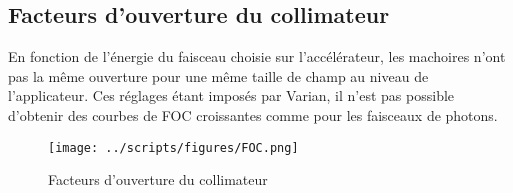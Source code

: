 \documentclass{article}
\begin{document}
\newpage
\subsection{Facteurs d'ouverture du collimateur}

En fonction de l'énergie du faisceau choisie sur l'accélérateur, les machoires n'ont pas la même ouverture pour une même taille de champ au niveau de l'applicateur. Ces réglages étant imposés par Varian, il n'est pas possible d'obtenir des courbes de FOC croissantes comme pour les faisceaux de photons.

\begin{figure}[h]
  \centering
  \texttt{[image: ../scripts/figures/FOC.png]}
  \caption{Facteurs d'ouverture du collimateur}
  \label{fig_foc}
\end{figure}

\clearpage


\nocite{*}
\end{document}
